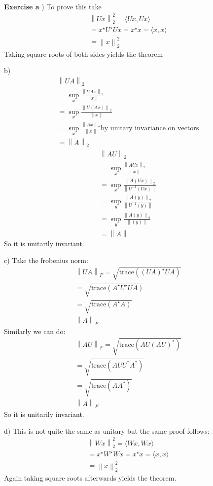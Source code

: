 \documentclass[12pt]{article}
\newenvironment{exercise}[1]{\vspace{.1in}\noindent\textbf{Exercise #1 \hspace{.05em}}}{}
\newcommand{\norm}[1]{\left\lVert#1\right\rVert}
\begin{document}
\begin{exercise}{1.2}
	a) To prove this take
	\begin{align}
		\norm{Ux}_2^2=\langle Ux,Ux\rangle                 \\
		=x^{\star}U^{\star}Ux=x^\star x=\langle x,x\rangle \\
		=\norm{x}_2^2
	\end{align}
	Taking square roots of both sides yields the theorem

	b)
	\begin{align}
		\norm{UA}_2                                                                   \\
		=\sup_{x}\frac{\norm{UAx}_2}{\norm{x}}                                        \\
		=\sup_{x}\frac{\norm{U(Ax)}_2}{\norm{x}}                                      \\
		=\sup_{x}\frac{\norm{Ax}_2}{\norm{x}} \text{by unitary invariance on vectors} \\
		=\norm{A}_2
	\end{align}
	\begin{align}
		\norm{AU}_2                                       \\
		=\sup_{x}\frac{\norm{AUx}_2}{\norm{x}}            \\
		=\sup_{x}\frac{\norm{A(Ux)}_2}{\norm{U^{-1}(Ux)}} \\
		=\sup_{y}\frac{\norm{A(y)}_2}{\norm{U^{-1}(y)}}   \\
		=\sup_{y}\frac{\norm{A(y)}_2}{\norm{(y)}}         \\
		=\norm{A}
	\end{align}
	So it is unitarily invariant.

	c) Take the frobenius norm:
	\begin{align}
		\norm{UA}_F=\sqrt{\text{trace}((UA)^{\star}UA)} \\
		=\sqrt{\text{trace}(A^{\star}U^\star UA)}       \\
		=\sqrt{\text{trace}(A^\star A)}                 \\
		\norm{A}_F
	\end{align}
	Similarly we can do:
	\begin{align}
		\norm{AU}_F=\sqrt{\text{trace}(AU(AU)^{*})} \\
		=\sqrt{\text{trace}(AU U^*A^*)}             \\
		=\sqrt{\text{trace}(A A^*)}                 \\
		\norm{A}_F
	\end{align}
	So it is unitarily invariant.

	d) This is not quite the same as unitary but the same proof follows:
	\begin{align}
		\norm{Wx}_2^2=\langle Wx,Wx\rangle                 \\
		=x^{\star}W^{\star}Wx=x^\star x=\langle x,x\rangle \\
		=\norm{x}_2^2
	\end{align}
	Again taking square roots afterwards yields the theorem.
\end{exercise}
\end{document}
